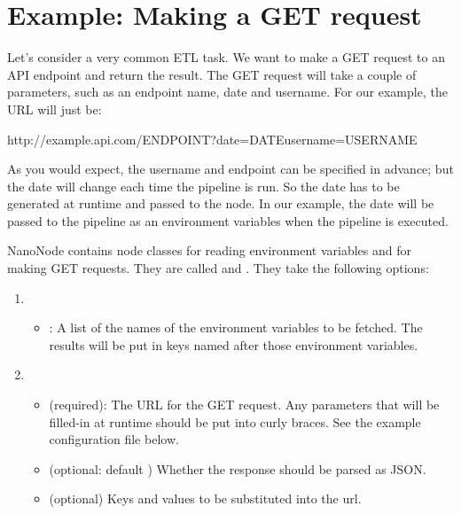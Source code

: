 \documentclass[letterpaper,10pt,english]{sphinxmanual}
\begin{document}
\section{Example: Making a GET request}
\label{\detokenize{data_journey:example-making-a-get-request}}
Let’s consider a very common ETL task. We want to make a GET request to an
API endpoint and return the result. The GET request will take a couple of
parameters, such as an endpoint name, date and username. For our example,
the URL will just be:

%
\begin{sphinxVerbatim}[commandchars=\\\{\}]
http://example.api.com/ENDPOINT?date=DATE\PYGZam{}username=USERNAME
\end{sphinxVerbatim}

As you would expect, the username and endpoint can be specified in advance;
but the date will change each time the pipeline is run. So the date has to
be generated at runtime and passed to the node. In our example, the
date will be passed to the pipeline as an environment variables 
when the pipeline is executed.

NanoNode contains node classes for reading environment variables and for making
GET requests. They are called  and
. They take the following options:
\begin{enumerate}
\def\theenumi{\arabic{enumi}}
\def\labelenumi{\theenumi .}
\makeatletter\def\p@enumii{\p@enumi \theenumi .}\makeatother
\item {} 
\begin{itemize}
\item {} 
: A list of the names of the environment variables to be fetched. The results will be put in keys named after those environment variables.

\end{itemize}

\item {} 
\begin{itemize}
\item {} 
 (required): The URL for the GET request. Any parameters that will be filled-in
at runtime should be put into curly braces. See the example configuration
file below.

\item {} 
 (optional: default ) Whether the response should be parsed as JSON.

\item {} 
 (optional) Keys and values to be substituted into the
url.

\end{itemize}

\end{enumerate}
\end{document}
